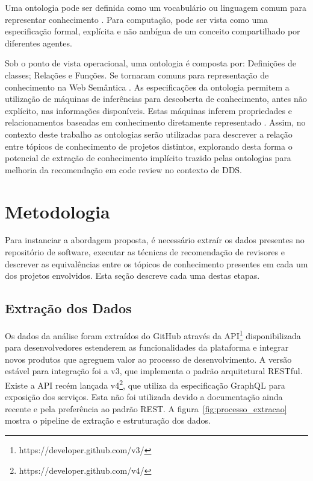 \documentclass[sigconf]{acmart}
\begin{document}
Uma ontologia pode ser definida como um vocabulário ou linguagem comum para representar conhecimento \cite{guarino1998}. Para computação, pode ser vista como uma especificação formal, explícita e não ambígua de um conceito compartilhado por diferentes agentes.

Sob o ponto de vista operacional, uma ontologia é composta por: Definições de classes; Relações e Funções. Se tornaram comuns para representação de conhecimento na Web Semântica \cite{berners2001}. As especificações da ontologia permitem a utilização de máquinas de inferências para descoberta de conhecimento, antes não explícito, nas informações disponíveis. Estas máquinas inferem propriedades e relacionamentos baseadas em conhecimento diretamente representado \cite{berners2001}. Assim, no contexto deste trabalho as ontologias serão utilizadas para descrever a relação entre tópicos de conhecimento de projetos distintos, explorando desta forma o potencial de extração de conhecimento implícito trazido pelas ontologias para melhoria da recomendação em code review no contexto de DDS.

\section{Metodologia}

Para instanciar a abordagem proposta, é necessário extraír os dados presentes no repositório de software, executar as técnicas de recomendação de revisores e descrever as equivalências entre os tópicos de conhecimento presentes em cada um dos projetos envolvidos. Esta seção descreve cada uma destas etapas.

\subsection{Extração dos Dados}

Os dados da análise foram extraídos do GitHub através da API\footnote{https://developer.github.com/v3/} disponibilizada para desenvolvedores estenderem as funcionalidades da plataforma e integrar novos produtos que agreguem valor ao processo de desenvolvimento. A versão estável para integração foi a v3, que implementa o padrão arquitetural RESTful\cite{fielding2002}. Existe a API recém lançada v4\footnote{https://developer.github.com/v4/}, que utiliza da especificação GraphQL para exposição dos serviços. Esta não foi utilizada devido a documentação ainda recente e pela preferência ao padrão REST. A figura~\ref{fig:processo_extracao} mostra o pipeline de extração e estruturação dos dados.
\end{document}
